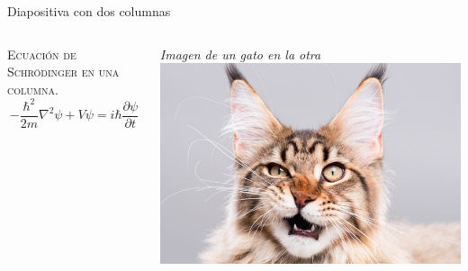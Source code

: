 \begin{frame}{Diapositiva con dos columnas}
    \begin{columns}
        \begin{column}{0.5\textwidth}
        \centering
        \textsc{Ecuación de Schrödinger en una columna}.
        \vspace{0.5cm}
        \begin{equation*}
            -\frac{\hbar^2}{2m}\nabla^2\psi + V\psi =  i\hbar\frac{\partial \psi}{\partial t}
        \end{equation*}
        \end{column}
        \vrule{}
        \begin{column}{0.5\textwidth}
            \centering
            \emph{\textrm{Imagen de un gato en la otra}}\\ [2ex]
            \centering
            \includegraphics[width=0.8\linewidth]{gato.jpeg}
        \end{column}
    \end{columns}
\end{frame}